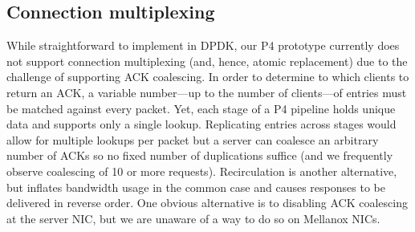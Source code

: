 
\subsection{Connection multiplexing}

While straightforward to implement in DPDK, our P4 prototype currently
does not support connection multiplexing (and, hence, atomic
replacement) due to the challenge of supporting ACK coalescing.
In order to determine to which clients to return an ACK, a variable
number---up to the number of clients---of entries must be matched
against every packet.  Yet, each stage of a P4 pipeline holds unique
data and supports only a single lookup.
Replicating entries across stages would allow for multiple
lookups per packet but a server can coalesce
an arbitrary number of ACKs so no fixed number of
duplications suffice (and we frequently observe coalescing
of 10 or more requests).  Recirculation is another
alternative, but inflates bandwidth usage in the common case
and causes responses to be delivered in reverse order. 
One obvious alternative is to disabling ACK coalescing at the server NIC, but we are unaware
of a way to do so on Mellanox NICs.




